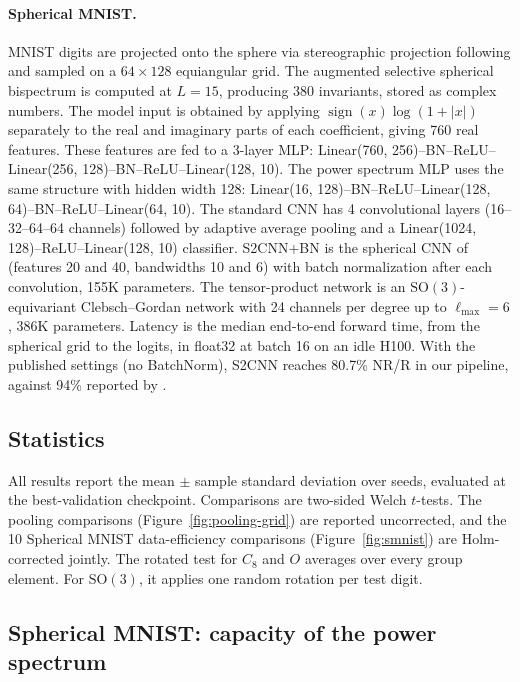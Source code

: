 \documentclass{article}
\theoremstyle{definition}
\theoremstyle{remark}
\newcommand{\SO}{\mathrm{SO}}
\theoremstyle{definition}
\begin{document}
\paragraph{Spherical MNIST.}
MNIST digits are projected onto the sphere via stereographic
projection following \citet{cohen2018spherical} and sampled on a
$64 \times 128$ equiangular grid. The augmented selective spherical bispectrum is
computed at $L{=}15$, producing 380 invariants, stored as complex numbers. The model input is obtained by applying
$\operatorname{sign}(x)\log(1+|x|)$ separately to the real and
imaginary parts of each coefficient, giving 760 real features. These features are
fed to a 3-layer MLP: Linear(760, 256)--BN--ReLU--Linear(256,
128)--BN--ReLU--Linear(128, 10). The power spectrum MLP uses the
same structure with hidden width 128: Linear(16, 128)--BN--ReLU--Linear(128,
64)--BN--ReLU--Linear(64, 10). The standard CNN has 4 convolutional
layers (16--32--64--64 channels) followed by adaptive average pooling
and a Linear(1024, 128)--ReLU--Linear(128, 10) classifier. S2CNN+BN is the spherical CNN of
\citet{cohen2018spherical} (features 20 and 40, bandwidths 10 and 6) with batch normalization
after each convolution, 155K parameters. The tensor-product network is an $\SO(3)$-equivariant
Clebsch--Gordan network with 24 channels per degree up to $\ell_{\max} = 6$, 386K parameters.
Latency is the median end-to-end forward time, from the spherical grid to the logits, in
float32 at batch 16 on an idle H100. With the published settings (no BatchNorm), S2CNN reaches
80.7\% NR/R in our pipeline, against 94\% reported by \citet{cohen2018spherical}.

\subsection{Statistics}

All results report the mean $\pm$ sample standard deviation over seeds, evaluated at the
best-validation checkpoint. Comparisons are two-sided Welch $t$-tests. The pooling comparisons
(Figure~\ref{fig:pooling-grid}) are reported uncorrected, and the 10 Spherical MNIST
data-efficiency comparisons (Figure~\ref{fig:smnist}) are Holm-corrected jointly. The rotated test for $C_8$ and $O$ averages over every group element. For $\SO(3)$, it
applies one random rotation per test digit.

\subsection{Spherical MNIST: capacity of the power spectrum}
\label{app:smnist-capacity}
\end{document}
